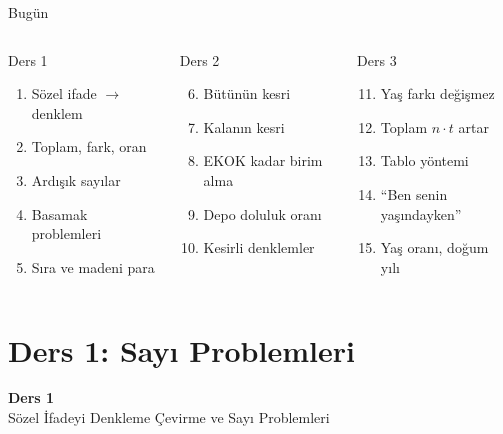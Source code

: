 \documentclass[aspectratio=169,11pt]{beamer}
\begin{document}
\begin{frame}{Bugün}
\begin{columns}[t]
\begin{block}{Ders 1}
\begin{enumerate}
\item Sözel ifade \(\to\) denklem
\item Toplam, fark, oran
\item Ardışık sayılar
\item Basamak problemleri
\item Sıra ve madeni para
\end{enumerate}
\end{block}
\begin{block}{Ders 2}
\begin{enumerate}\setcounter{enumi}{5}
\item Bütünün kesri
\item Kalanın kesri
\item EKOK kadar birim alma
\item Depo doluluk oranı
\item Kesirli denklemler
\end{enumerate}
\end{block}
\begin{block}{Ders 3}
\begin{enumerate}\setcounter{enumi}{10}
\item Yaş farkı değişmez
\item Toplam \(n\cdot t\) artar
\item Tablo yöntemi
\item ``Ben senin yaşındayken''
\item Yaş oranı, doğum yılı
\end{enumerate}
\end{block}
\end{columns}
\end{frame}

\section{Ders 1: Sayı Problemleri}
\begin{frame}
\centering\Large\color{anamavi}\textbf{Ders 1}\\[6pt]\normalsize Sözel İfadeyi Denkleme Çevirme ve Sayı Problemleri
\end{frame}
\end{document}
